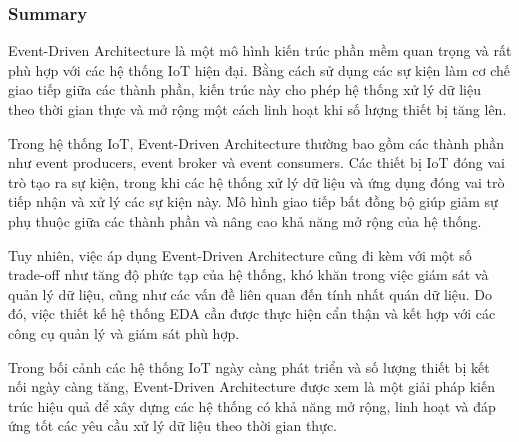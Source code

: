 \subsubsection{Summary}
Event-Driven Architecture là một mô hình kiến trúc phần mềm quan trọng và rất phù hợp với các hệ thống IoT hiện đại. Bằng cách sử dụng các sự kiện làm cơ chế giao tiếp giữa các thành phần, kiến trúc này cho phép hệ thống xử lý dữ liệu theo thời gian thực và mở rộng một cách linh hoạt khi số lượng thiết bị tăng lên.

Trong hệ thống IoT, Event-Driven Architecture thường bao gồm các thành phần như event producers, event broker và event consumers. Các thiết bị IoT đóng vai trò tạo ra sự kiện, trong khi các hệ thống xử lý dữ liệu và ứng dụng đóng vai trò tiếp nhận và xử lý các sự kiện này. Mô hình giao tiếp bất đồng bộ giúp giảm sự phụ thuộc giữa các thành phần và nâng cao khả năng mở rộng của hệ thống.

Tuy nhiên, việc áp dụng Event-Driven Architecture cũng đi kèm với một số trade-off như tăng độ phức tạp của hệ thống, khó khăn trong việc giám sát và quản lý dữ liệu, cũng như các vấn đề liên quan đến tính nhất quán dữ liệu. Do đó, việc thiết kế hệ thống EDA cần được thực hiện cẩn thận và kết hợp với các công cụ quản lý và giám sát phù hợp.

Trong bối cảnh các hệ thống IoT ngày càng phát triển và số lượng thiết bị kết nối ngày càng tăng, Event-Driven Architecture được xem là một giải pháp kiến trúc hiệu quả để xây dựng các hệ thống có khả năng mở rộng, linh hoạt và đáp ứng tốt các yêu cầu xử lý dữ liệu theo thời gian thực.